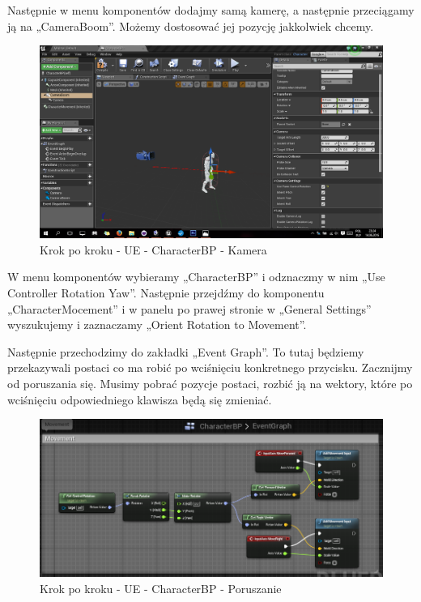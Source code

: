 \documentclass[12pt]{xmgr}
\begin{document}
Następnie w menu komponentów dodajmy samą kamerę, a następnie przeciągamy ją na „CameraBoom”. Możemy dostosować jej pozycję jakkolwiek chcemy.

\begin{figure}[!htb]
    \begin{center}
    \includegraphics[scale=0.35]{Screeny/UeKrokPoKroku/UE-CharacterBP-Camera.png}
    \end{center}
    \caption{Krok po kroku - UE -  CharacterBP - Kamera}
\end{figure}


W menu komponentów wybieramy „CharacterBP” i odznaczmy w nim „Use Controller Rotation Yaw”. Następnie przejdźmy do komponentu „CharacterMocement” i w panelu po prawej stronie w „General Settings” wyszukujemy i zaznaczamy „Orient Rotation to Movement”.

Następnie przechodzimy do zakładki „Event Graph”. To tutaj będziemy przekazywali postaci co ma robić po wciśnięciu konkretnego przycisku. Zacznijmy od poruszania się. Musimy pobrać pozycje postaci, rozbić ją na wektory, które po wciśnięciu odpowiedniego klawisza będą się zmieniać.

\begin{figure}[!htb]
    \begin{center}
    \includegraphics[scale=0.35]{Screeny/UeKrokPoKroku/UE-CharacterBP-Movement.png}
    \end{center}
    \caption{Krok po kroku - UE -  CharacterBP - Poruszanie}
\end{figure}
\end{document}
